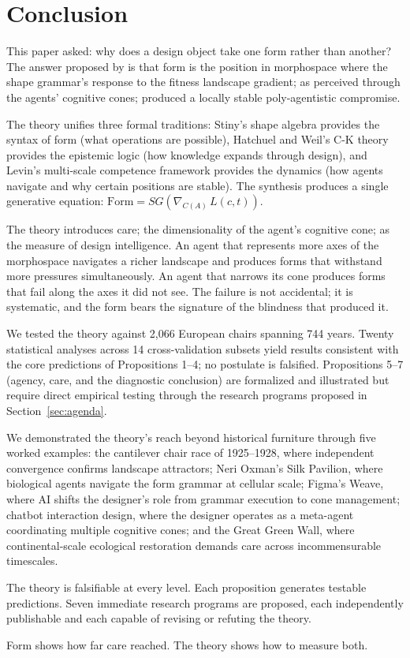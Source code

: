 \section{Conclusion}
\label{sec:conclusion}

This paper asked: why does a design object take one form rather than another? The answer proposed by \formlaere{} is that form is the position in morphospace where the shape grammar's response to the fitness landscape gradient; as perceived through the agents' cognitive cones; produced a locally stable poly-agentistic compromise.

The theory unifies three formal traditions: Stiny's shape algebra provides the syntax of form (what operations are possible), Hatchuel and Weil's C-K theory provides the epistemic logic (how knowledge expands through design), and Levin's multi-scale competence framework provides the dynamics (how agents navigate and why certain positions are stable). The synthesis produces a single generative equation: $\mathrm{Form} = SG(\nabla_{C(A)}\, L(c,t))$.

The theory introduces care; the dimensionality of the agent's cognitive cone; as the measure of design intelligence. An agent that represents more axes of the morphospace navigates a richer landscape and produces forms that withstand more pressures simultaneously. An agent that narrows its cone produces forms that fail along the axes it did not see. The failure is not accidental; it is systematic, and the form bears the signature of the blindness that produced it.

We tested the theory against 2,066 European chairs spanning 744 years. Twenty statistical analyses across 14 cross-validation subsets yield results consistent with the core predictions of Propositions 1--4; no postulate is falsified. Propositions 5--7 (agency, care, and the diagnostic conclusion) are formalized and illustrated but require direct empirical testing through the research programs proposed in Section~\ref{sec:agenda}.

We demonstrated the theory's reach beyond historical furniture through five worked examples: the cantilever chair race of 1925--1928, where independent convergence confirms landscape attractors; Neri Oxman's Silk Pavilion, where biological agents navigate the form grammar at cellular scale; Figma's Weave, where AI shifts the designer's role from grammar execution to cone management; chatbot interaction design, where the designer operates as a meta-agent coordinating multiple cognitive cones; and the Great Green Wall, where continental-scale ecological restoration demands care across incommensurable timescales.

The theory is falsifiable at every level. Each proposition generates testable predictions. Seven immediate research programs are proposed, each independently publishable and each capable of revising or refuting the theory.

Form shows how far care reached. The theory shows how to measure both.
